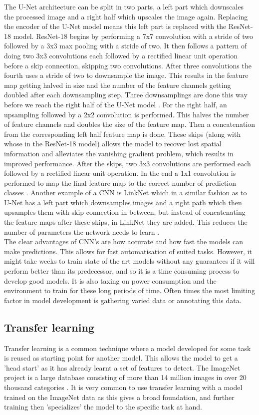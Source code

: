 The U-Net architecture can be split in two parts, a left part which downscales the processed image and a right half which upscales the image again. Replacing the encoder of the U-Net model means this left part is replaced with the ResNet-18 model. ResNet-18 begins by performing a 7x7 convolution with a stride of two followed by a 3x3 max pooling with a stride of two. It then follows a pattern of doing two 3x3 convolutions each followed by a rectified linear unit operation before a skip connection, skipping two convolutions. After three convolutions the fourth uses a stride of two to downsample the image. This results in the feature map getting halved in size and the number of the feature channels getting doubled after each downsampling step. Three downsamplings are done this way before we reach the right half of the U-Net model \cite{resnet}. For the right half, an upsampling followed by a 2x2 convolution is performed. This halves the number of feature channels and doubles the size of the feature map. Then a concatenation from the corresponding left half feature map is done. These skips (along with whose in the ResNet-18 model) allows the model to recover lost spatial information and alleviates the vanishing gradient problem, which results in improved performance. After the skips, two 3x3 convolutions are performed each followed by a rectified linear unit operation. In the end a 1x1 convolution is performed to map the final feature map to the correct number of prediction classes \cite{unetarticle}. Another example of a CNN is LinkNet which in a similar fashion as to U-Net has a left part which downsamples images and a right path which then upsamples them with skip connection in between, but instead of concatenating the feature maps after these skips, in LinkNet they are added. This reduces the number of parameters the network needs to learn \cite{linknet}.\\
The clear advantages of CNN's are how accurate and how fast the models can make predictions. This allows for fast automatisation of suited tasks. However, it might take weeks to train state of the art models without any guarantees if it will perform better than its predecessor, and so it is a time consuming process to develop good models. It is also taxing on power consumption and the environment to train for these long periods of time. Often times the most limiting factor in model development is gathering varied data or annotating this data.

\subsection{Transfer learning}
Transfer learning is a common technique where a model developed for some task is reused as starting point for another model. This allows the model to get a 'head start' as it has already learnt a set of features to detect. The ImageNet project is a large database consisting of more than 14 million images in over 20 thousand categories \cite{trasnferlearning}. It is very common to use transfer learning with a model trained on the ImageNet data as this gives a broad foundation, and further training then 'specializes' the model to the specific task at hand.


